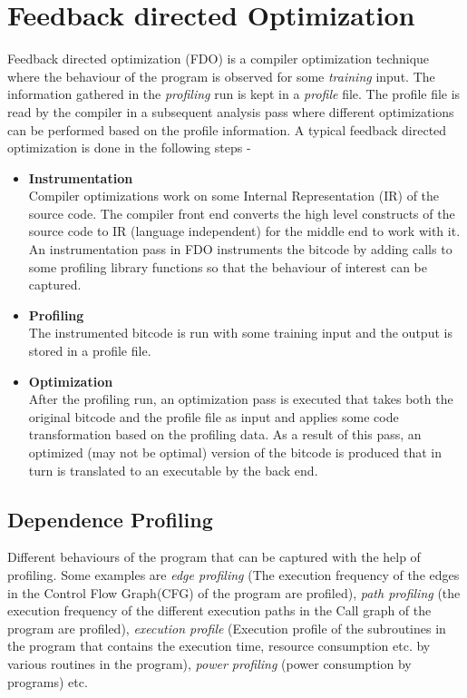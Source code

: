\documentclass[10pt]{report}          %
\begin{document}
 
\section{Feedback directed Optimization}
\label{sec:fdo}

Feedback directed optimization (FDO) is a compiler optimization technique where the behaviour of the program is observed for some \textit{training} input.  The information gathered in the \textit{profiling} run is kept in a \textit{profile} file.  The profile file is read by the compiler in a subsequent analysis pass where different optimizations can be performed based on the profile information.  A typical feedback directed optimization is done in the following steps -

\begin{itemize}
\item \textbf{Instrumentation}\\
Compiler optimizations work on some Internal Representation (IR) of the source code.  The compiler front end converts the high level constructs of the source code to IR (language independent) for the middle end to work with it.  An instrumentation pass in FDO instruments the bitcode by adding calls to some profiling library functions so that the behaviour of interest can be captured.
\item \textbf{Profiling} \\
The instrumented bitcode is run with some training input and the output is stored in a profile file. 
\item \textbf{Optimization} \\
After the profiling run, an optimization pass is executed that takes both the original bitcode and the profile file as input and applies some code transformation based on the profiling data.  As a result of this pass, an optimized (may not be optimal) version of the bitcode is produced that in turn is translated to an executable by the back end.
\end{itemize} 

\subsection{Dependence Profiling}

Different behaviours of the program that can be captured with the help of profiling.  Some examples are \textit{edge profiling} (The execution frequency of the edges in the Control Flow Graph(CFG) of the program are profiled), \textit{path profiling} (the execution frequency of the different execution paths in the Call graph of the program are profiled), \textit{execution profile}  (Execution profile of the subroutines in the program that contains the execution time, resource consumption etc. by various routines in the program), \textit{power profiling} (power consumption by programs) etc. \\
\end{document}
